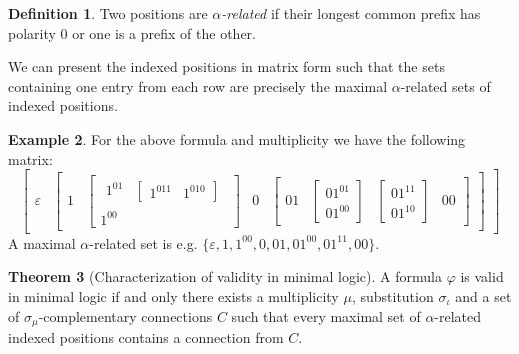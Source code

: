\documentclass[11pt]{article}
\theoremstyle{definition}
\newtheorem{theorem}{Theorem}[section]
\theoremstyle{definition}
\theoremstyle{definition}
\theoremstyle{definition}
\theoremstyle{definition}
\newtheorem{definition}[theorem]{Definition}
\theoremstyle{definition}
\newtheorem{example}[theorem]{Example}
\theoremstyle{definition}
\begin{document}
	\begin{definition}
		Two positions are \emph{$\alpha$-related} if their longest common prefix has polarity $0$ or one is a prefix of the other.
	\end{definition}

	We can present the indexed positions in matrix form such that the sets containing one entry from each row are precisely the maximal $\alpha$-related sets of indexed positions.

	\begin{example}
		For the above formula and multiplicity we have the following matrix:
		\[
		\begin{bmatrix}
			\varepsilon &
			\begin{bmatrix}
				1 &
				\begin{bmatrix}
					\begin{matrix}
						1^01 & \begin{bmatrix}
							1^011 & 1^010
						\end{bmatrix}
					\end{matrix} \\ 1^00
				\end{bmatrix} &
				0 &
				\begin{bmatrix}
					01 &
					\begin{bmatrix}
						01^01 \\ 01^00
					\end{bmatrix} &
					\begin{bmatrix}
						01^11 \\ 01^10
					\end{bmatrix} &
					00
				\end{bmatrix}
			\end{bmatrix}
		\end{bmatrix}
		\]
	A maximal $\alpha$-related set is e.g. $\{\varepsilon, 1, 1^00, 0, 01, 01^00, 01^11, 00\}$.
	\end{example}

	\begin{theorem}[Characterization of validity in minimal logic]
		A formula $\varphi$ is valid in minimal logic if and only there exists a multiplicity $\mu$, substitution $\sigma_\iota$ and a set of $\sigma_\mu$-complementary connections $C$ such that every maximal set of $\alpha$-related indexed positions contains a connection from $C$.
	\end{theorem}
\end{document}
